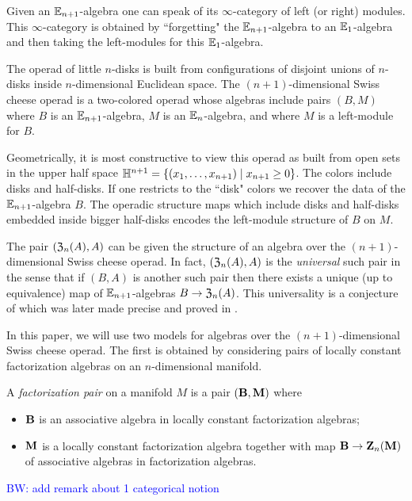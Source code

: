 \documentclass[11pt]{amsart}
\numberwithin{equation}{section}
\def\brian{\textcolor{blue}{BW: }\textcolor{blue}}
\begin{document}
Given an $\mathbb E_{n+1}$-algebra one can speak of its $\infty$-category of left (or right) modules.
This $\infty$-category is obtained by ``forgetting" the $\mathbb E_{n+1}$-algebra to an $\mathbb E_1$-algebra and then taking the left-modules for this $\mathbb E_1$-algebra.

The operad of little $n$-disks is built from configurations of disjoint unions of $n$-disks inside $n$-dimensional Euclidean space.
The $(n+1)$-dimensional Swiss cheese operad is a two-colored operad whose algebras include pairs $(B, M)$ where $B$ is an $\mathbb E_{n+1}$-algebra, $M$ is an $\mathbb E_n$-algebra, and where $M$ is a left-module for $B$.

Geometrically, it is most constructive to view this operad as built from open sets in the upper half space $\mathbb H^{n+1} = \{(x_1,\ldots, x_{n+1}) \; | \; x_{n+1} \geq 0\}$.
The colors include disks and half-disks. 
If one restricts to the ``disk" colors we recover the data of the $\mathbb E_{n+1}$-algebra $B$. 
The operadic structure maps which include disks and half-disks embedded inside bigger half-disks encodes the left-module structure of $B$ on $M$.

The pair $(\mathfrak Z_{n} (A), A)$ can be given the structure of an algebra over the $(n+1)$-dimensional Swiss cheese operad. 
In fact, $(\mathfrak Z_{n} (A), A)$ is the {\em universal} such pair in the sense that if $(B, A)$ is another such pair then there exists a unique (up to equivalence) map of $\mathbb E_{n+1}$-algebras $B \to \mathfrak Z_n(A)$. 
This universality is a conjecture of \cite{Kontsevich} which was later made precise and proved in \cite{Thomas, Tamarkin, Dolgushev, jnkf others?}. 

In this paper, we will use two models for algebras over the $(n+1)$-dimensional Swiss cheese operad. 
The first is obtained by considering pairs of locally constant factorization algebras on an $n$-dimensional manifold. 

\begin{dfn}\label{dfn:pair}
A {\em factorization pair} on a manifold $M$ is a pair $(\mathbf B, \mathbf M)$ where
\begin{itemize}
\item $\mathbf B$ is an associative algebra in locally constant factorization algebras;
\item $\mathbf M$ is a locally constant factorization algebra together with map $\mathbf B \to \mathbf Z_n(\mathbf M)$ of associative algebras in factorization algebras.
\end{itemize}
\brian{add remark about 1 categorical notion}
\end{dfn}
\end{document}
